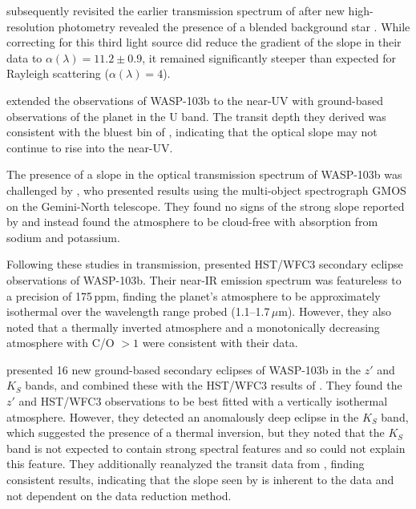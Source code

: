 \documentclass[twocolumn]{aastex63}
\begin{document}
\cite{Southworth2016} subsequently revisited the earlier transmission spectrum of \cite{Southworth2015} after new high-resolution photometry revealed the presence of a blended background star \citep{Wollert2015,Ngo2016}. While correcting for this third light source did reduce the gradient of the slope in their data to $\alpha(\lambda) = 11.2 \pm 0.9$, it remained significantly steeper than expected for Rayleigh scattering ($\alpha(\lambda) = 4$). 

\cite{Turner2017} extended the observations of WASP-103b to the near-UV with ground-based observations of the planet in the U band. The transit depth they derived was consistent with the bluest bin of \cite{Southworth2016}, indicating that the optical slope may not continue to rise into the near-UV.

The presence of a slope in the optical transmission spectrum of WASP-103b was challenged by \cite{Lendl2017}, who presented results using the multi-object spectrograph GMOS on the Gemini-North telescope. They found no signs of the strong slope reported by \cite{Southworth2015} and instead found the atmosphere to be cloud-free with absorption from sodium and potassium. 

Following these studies in transmission, \cite{Cartier2017} presented HST/WFC3 secondary eclipse observations of WASP-103b. Their near-IR emission spectrum was featureless to a precision of 175\,ppm, finding the planet's atmosphere to be approximately isothermal over the wavelength range probed (1.1--1.7\,$\mu$m). However, they also noted that a thermally inverted atmosphere and a monotonically decreasing atmosphere with C/O $>1$ were consistent with their data.

\cite{Delrez2018} presented 16 new ground-based secondary eclipses of WASP-103b in the $z'$ and $K_S$ bands, and combined these with the HST/WFC3 results of \cite{Cartier2017}. They found the $z'$ and HST/WFC3 observations to be best fitted with a vertically isothermal atmosphere. However, they detected an anomalously deep eclipse in the $K_S$ band, which suggested the presence of a thermal inversion, but they noted that the $K_S$ band is not expected to contain strong spectral features and so could not explain this feature. They additionally reanalyzed the transit data from \cite{Southworth2015}, finding consistent results, indicating that the slope seen by \cite{Southworth2016} is inherent to the data and not dependent on the data reduction method. 
\end{document}
